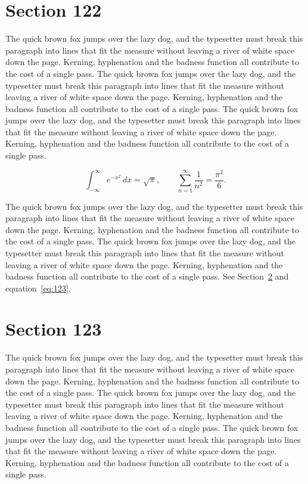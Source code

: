\documentclass{article}
\begin{document}
\section{Section 122}
\label{sec:122}
The quick brown fox jumps over the lazy dog, and the typesetter must break this paragraph into lines that fit the measure without leaving a river of white space down the page. Kerning, hyphenation and the badness function all contribute to the cost of a single pass. The quick brown fox jumps over the lazy dog, and the typesetter must break this paragraph into lines that fit the measure without leaving a river of white space down the page. Kerning, hyphenation and the badness function all contribute to the cost of a single pass. The quick brown fox jumps over the lazy dog, and the typesetter must break this paragraph into lines that fit the measure without leaving a river of white space down the page. Kerning, hyphenation and the badness function all contribute to the cost of a single pass. 

\begin{equation}\label{eq:122}
\int_{-\infty}^{\infty} e^{-x^{2}}\,dx = \sqrt{\pi}, \qquad
\sum_{n=1}^{\infty} \frac{1}{n^{2}} = \frac{\pi^{2}}{6}.
\end{equation}

The quick brown fox jumps over the lazy dog, and the typesetter must break this paragraph into lines that fit the measure without leaving a river of white space down the page. Kerning, hyphenation and the badness function all contribute to the cost of a single pass. The quick brown fox jumps over the lazy dog, and the typesetter must break this paragraph into lines that fit the measure without leaving a river of white space down the page. Kerning, hyphenation and the badness function all contribute to the cost of a single pass. 
See Section~\ref{sec:123} and equation~\eqref{eq:123}.
\section{Section 123}
\label{sec:123}
The quick brown fox jumps over the lazy dog, and the typesetter must break this paragraph into lines that fit the measure without leaving a river of white space down the page. Kerning, hyphenation and the badness function all contribute to the cost of a single pass. The quick brown fox jumps over the lazy dog, and the typesetter must break this paragraph into lines that fit the measure without leaving a river of white space down the page. Kerning, hyphenation and the badness function all contribute to the cost of a single pass. The quick brown fox jumps over the lazy dog, and the typesetter must break this paragraph into lines that fit the measure without leaving a river of white space down the page. Kerning, hyphenation and the badness function all contribute to the cost of a single pass. 
\end{document}
